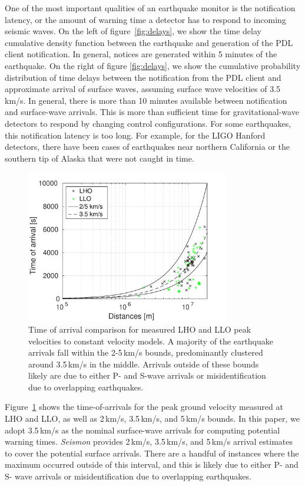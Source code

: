 \documentclass[twocolumn, aps, superscriptaddress]{revtex4}
\begin{document}
One of the most important qualities of an earthquake monitor is the notification latency, or the amount of warning time a detector has to respond to incoming seismic waves. On the left of figure~\ref{fig:delays}, we show the time delay cumulative density function between the earthquake and generation of the PDL client notification. In general, notices are generated within 5 minutes of the earthquake. On the right of figure \ref{fig:delays}, we show the cumulative probability distribution of time delays between the notification from the PDL client and approximate arrival of surface waves, assuming surface wave velocities of 3.5\,km/s. In general, there is more than 10 minutes available between notification and surface-wave arrivals. This is more than sufficient time for gravitational-wave detectors to respond by changing control configurations. For some earthquakes, this notification latency is too long. For example, for the LIGO Hanford detectors, there have been cases of earthquakes near northern California or the southern tip of Alaska that were not caught in time.

\begin{figure}[t]
\hspace*{-0.5cm}
 \includegraphics[width=3.5in]{TOA.pdf}
 \caption{Time of arrival comparison for measured LHO and LLO peak velocities to constant velocity models. A majority of the earthquake arrivals fall within the 2-5\,km/s bounds, predominantly clustered around 3.5\,km/s in the middle. Arrivals outside of these bounds likely are due to either P- and S-wave arrivals or misidentification due to overlapping earthquakes.}
 \label{fig:TOA}
\end{figure}

Figure~\ref{fig:TOA} shows the time-of-arrivals for the peak ground velocity measured at LHO and LLO, as well as 2\,km/s, 3.5\,km/s, and 5\,km/s bounds. In this paper, we adopt 3.5\,km/s as the nominal surface-wave arrivals for computing potential warning times. \emph{Seismon} provides 2\,km/s, 3.5\,km/s, and 5\,km/s arrival estimates to cover the potential surface arrivals. There are a handful of instances where the maximum occurred outside of this interval, and this is likely due to either P- and S- wave arrivals or misidentification due to overlapping earthquakes.
\end{document}
